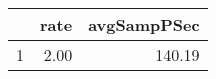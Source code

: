 \begin{table}[h]
\centering
\begin{tabular}{rrr}
  \hline
 & rate & avgSampPSec \\ 
  \hline
1 & 2.00 & 140.19 \\ 
   \hline
\end{tabular}
\end{table}
